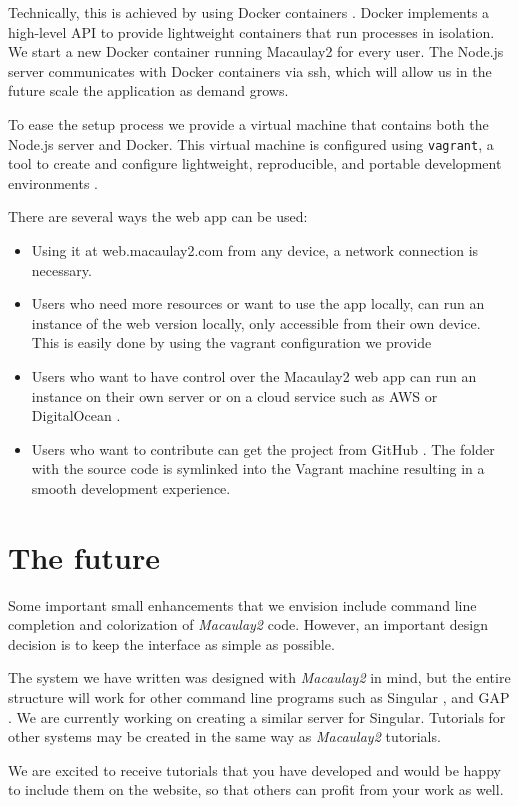 \documentclass[twocolumn]{article}
\def\M2{{\it Macaulay2}}
\begin{document}
Technically, this is achieved by using Docker containers \cite{docker}. Docker implements
a high-level  API to provide lightweight containers that run processes in isolation.
We start a new Docker container running Macaulay2 for every user. The Node.js
server communicates with Docker containers via ssh, which will allow us in the future
scale the application as demand grows.

To ease the setup process we provide a virtual machine that contains both the Node.js server
and Docker. This virtual machine is configured using {\tt vagrant}, a tool to create and
configure lightweight, reproducible, and portable development environments \cite{vagrant}.

There are several ways the web app can be used:
\begin{itemize}
    \item Using it at web.macaulay2.com from any device, a network connection is necessary.
    \item Users who need more resources or want to use the app locally, can
    run an instance of the web version locally, only accessible from their own device.
    This is easily done by using the vagrant configuration we provide
    \item Users who want to have control over the Macaulay2 web app can run an
     instance on their own server or on a cloud
    service such as AWS or DigitalOcean \cite{AWS,digitalocean}.
     \item Users who want to contribute can get the project from GitHub \cite{github}.
     The folder
     with the source code is symlinked into the Vagrant machine resulting
     in a smooth development experience.
\end{itemize}


\section{The future}

Some important small enhancements that we envision include command
line completion and colorization of \M2 code.  However, an important
design decision is to keep the interface as simple as possible.

The system we have written was designed with \M2 in mind, but 
the entire structure will work for other command line programs such as Singular \cite{singular},
and GAP \cite{GAP4}.  We are currently working on creating a similar server for Singular.
Tutorials for other systems may be created in the same way as \M2 tutorials.

We are excited to receive tutorials that you have developed and would be happy
to include them on the website, so that others can profit from your work as
well.





\end{document}
